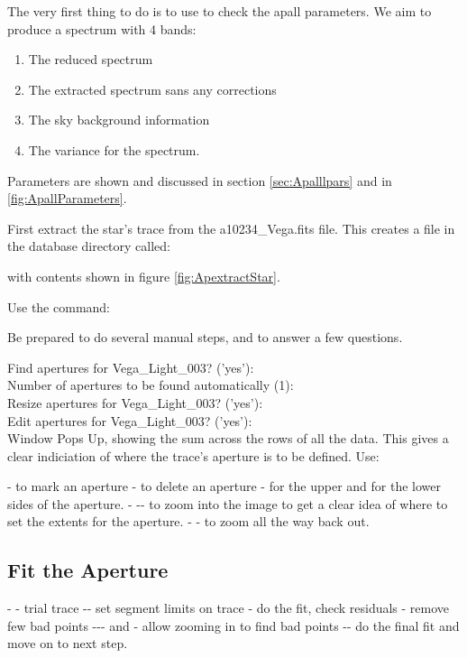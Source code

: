 The very first thing to do is to use  to check the
apall parameters. We aim to produce a spectrum with 4 bands:
\vspace{-.15cm}
\begin{enumerate}\addtolength{\itemsep}{-0.5\baselineskip}
   \item  The reduced spectrum
   \item  The extracted spectrum sans any corrections
   \item  The sky background information
   \item  The variance for the spectrum.
\end{enumerate}

Parameters are shown and discussed in section \ref{sec:Apalllpars} and in
\ref{fig:ApallParameters}.


First extract the star's trace from the a10234\_Vega.fits file. This creates
a file in the database directory called:


with contents shown in figure \ref{fig:ApextractStar}.

Use the command:


Be prepared to do several manual steps, and to answer a few questions.


Find apertures for Vega_Light_003? ('yes'):  \\
Number of apertures to be found automatically (1):  \\
Resize apertures for Vega_Light_003? ('yes'):  \\
Edit apertures for Vega_Light_003? ('yes'):  \\

Window Pops Up, showing the sum across the rows of all the data.
This gives a clear indiciation of where the trace's aperture
is to be defined. Use:

-  to mark an aperture
-  to delete an aperture
-  for the upper and  for the lower sides of the aperture.
- -- to zoom into the image to get a clear idea
   of where to set the extents for the aperture.
- - to zoom all the way back out.

\subsection{Fit the Aperture}
- - trial trace
--  set segment limits on trace
- do the fit, check residuals
- remove few bad points
--- and - allow zooming in to
find bad points
-- do the final fit and move on to next step.


